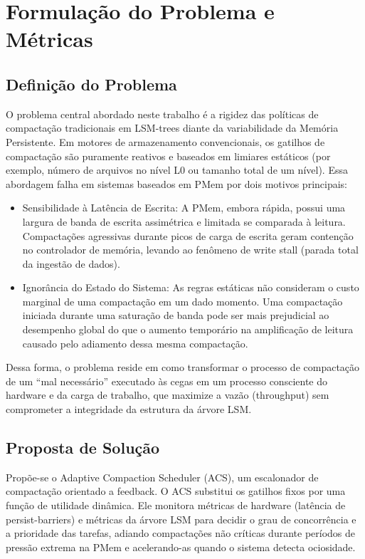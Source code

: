 \chapter{Formulação do Problema e Métricas}\label{cap:proposta}

\section{Definição do Problema}
O problema central abordado neste trabalho é a rigidez das políticas de compactação tradicionais em LSM-trees diante da variabilidade da Memória Persistente. Em motores de armazenamento convencionais, os gatilhos de compactação são puramente reativos e baseados em limiares estáticos (por exemplo, número de arquivos no nível L0 ou tamanho total de um nível). Essa abordagem falha em sistemas baseados em PMem por dois motivos principais:

\begin{itemize}
    \item Sensibilidade à Latência de Escrita: A PMem, embora rápida, possui uma largura de banda de escrita assimétrica e limitada se comparada à leitura. Compactações agressivas durante picos de carga de escrita geram contenção no controlador de memória, levando ao fenômeno de write stall (parada total da ingestão de dados). 
    \item Ignorância do Estado do Sistema: As regras estáticas não consideram o custo marginal de uma compactação em um dado momento. Uma compactação iniciada durante uma saturação de banda pode ser mais prejudicial ao desempenho global do que o aumento temporário na amplificação de leitura causado pelo adiamento dessa mesma compactação.
\end{itemize}

Dessa forma, o problema reside em como transformar o processo de compactação de um \enquote{mal necessário} executado às cegas em um processo consciente do hardware e da carga de trabalho, que maximize a vazão (throughput) sem comprometer a integridade da estrutura da árvore LSM.

\section{Proposta de Solução}

Propõe-se o Adaptive Compaction Scheduler (ACS), um escalonador de compactação orientado a feedback. O ACS substitui os gatilhos fixos por uma função de utilidade dinâmica. Ele monitora métricas de hardware (latência de persist-barriers) e métricas da árvore LSM para decidir o grau de concorrência e a prioridade das tarefas, adiando compactações não críticas durante períodos de pressão extrema na PMem e acelerando-as quando o sistema detecta ociosidade.
